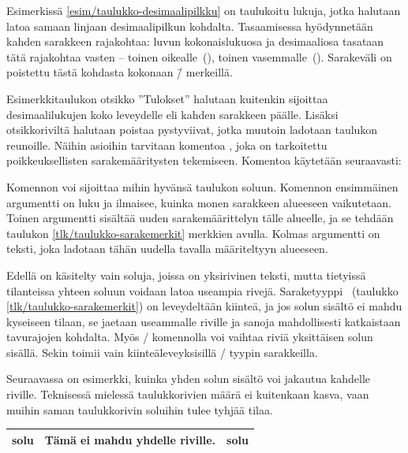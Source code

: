 Esimerkissä \ref{esim/taulukko-desimaalipilkku} on taulukoitu lukuja,
jotka halutaan latoa samaan linjaan desimaalipilkun kohdalta.
Tasaamisessa hyödynnetään kahden sarakkeen rajakohtaa: luvun
kokonaislukuosa ja desimaaliosa tasataan tätä rajakohtaa vasten --
toinen oikealle~(), toinen vasemmalle~(). Sarakeväli
on poistettu tästä kohdasta kokonaan \=/ merkeillä.

Esimerkkitaulukon otsikko ''Tulokset'' halutaan kuitenkin sijoittaa
desimaalilukujen koko leveydelle eli kahden sarakkeen päälle. Lisäksi
otsikkoriviltä halutaan poistaa pystyviivat, jotka muutoin ladotaan
taulukon reunoille. Näihin asioihin tarvitaan komentoa
, joka on tarkoitettu poikkeuksellisten
sarakemääritysten tekemiseen. Komentoa käytetään seuraavasti:

\begin{koodilohkosis}
\end{koodilohkosis}

\noindent
Komennon  voi sijoittaa mihin hyvänsä taulukon
soluun. Komennon ensimmäinen argumentti  on luku ja ilmaisee,
kuinka monen sarakkeen alueeseen vaikutetaan. Toinen argumentti
 sisältää uuden sarakemäärittelyn tälle alueelle, ja
se tehdään taulukon \ref{tlk/taulukko-sarakemerkit} merkkien avulla.
Kolmas argumentti on teksti, joka ladotaan tähän uudella tavalla
määriteltyyn alueeseen.

Edellä on käsitelty vain soluja, joissa on yksirivinen teksti, mutta
tietyissä tilanteissa yhteen soluun voidaan latoa useampia rivejä.
Saraketyyppi~ (taulukko \ref{tlk/taulukko-sarakemerkit}) on
leveydeltään kiinteä, ja jos solun sisältö ei mahdu kyseiseen tilaan, se
jaetaan useammalle riville ja sanoja mahdollisesti katkaistaan
tavurajojen kohdalta. Myös \-/ komennolla voi vaihtaa
riviä yksittäisen solun sisällä. Sekin toimii vain kiinteäleveyksisillä
\-/ tyypin sarakkeilla.

Seuraavassa on esimerkki, kuinka yhden solun sisältö voi jakautua
kahdelle riville. Teknisessä mielessä taulukkorivien määrä ei kuitenkaan
kasva, vaan muihin saman taulukkorivin soluihin tulee tyhjää tilaa.

\komentoi{\keno}
\begin{koodilohkosis}
\begin{tabular}{|l|p{6.5em}|l|}
  \hline solu & Tämä ei mahdu yhdelle riville. & solu \\ \hline
\end{tabular}
\end{koodilohkosis}


